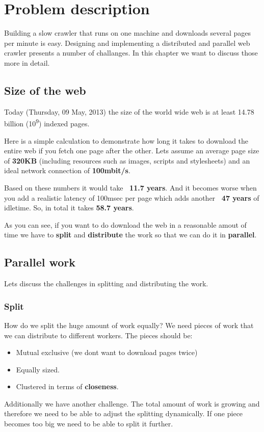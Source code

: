 \chapter{Problem description} %
Building a slow crawler that runs on one machine and downloads several pages per minute is easy. Designing and implementing a distributed and parallel web crawler presents a number of challanges. In this chapter we want to discuss those more in detail.

\label{Chapter3} %


\section{Size of the web}
Today (Thursday, 09 May, 2013) the size of the world wide web is at least 14.78 billion (10\textsuperscript{9}) indexed pages.\cite{wwwsize}

Here is a simple calculation to demonstrate how long it takes to download the entire web if you fetch one page after the other.
Lets assume an average page size of \textbf{320KB} \cite{webmetrics} (including resources such as images, scripts and stylesheets) and an ideal network connection of \textbf{100mbit/s}.

Based on these numbers it would take \textbf{~11.7 years}. And it becomes worse when you add a realistic latency of 100msec per page which adds another \textbf{~47 years} of idletime. So, in total it takes \textbf{58.7 years}.

As you can see, if you want to do download the web in a reasonable amout of time we have to \textbf{split} and \textbf{distribute} the work so that we can do it in \textbf{parallel}.

\section{Parallel work}
Lets discuss the challenges in splitting and distributing the work.
\subsection{Split}
How do we split the huge amount of work equally? We need pieces of work that we can distribute to different workers. The pieces should be:
\begin{itemize}
\item Mutual exclusive (we dont want to download pages twice)
\item Equally sized.
\item Clustered in terms of \textbf{closeness}.
\end{itemize}
Additionally we have another challenge. The total amount of work is growing and therefore we need to be able to adjust the splitting dynamically. If one piece becomes too big we need to be able to split it further.
